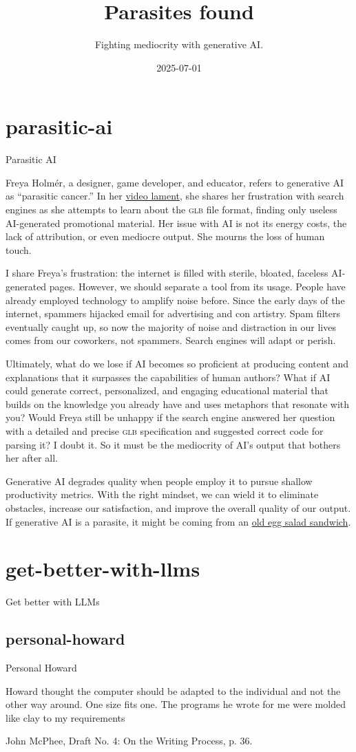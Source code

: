 \documentclass{article}
\title{Parasites found}
\subtitle{Fighting mediocrity with generative AI.}
\date{2025-07-01}
\begin{document}
\section{parasitic-ai}{Parasitic AI}

Freya Holmér, a designer, game developer, and educator, refers to generative AI as ``parasitic cancer.''
In her \href{https://youtu.be/-opBifFfsMY?si=5SZIgOB76GTq0hBu}{video lament},
she shares her frustration with search engines as she attempts to learn about the \textsc{glb} file format,
finding only useless AI-generated promotional material.
Her issue with AI is not its energy costs, the lack of attribution, or even mediocre output.
She mourns the loss of human touch.

I share Freya’s frustration: the internet is filled with sterile, bloated, faceless AI-generated pages.
However, we should separate a tool from its usage.
People have already employed technology to amplify noise before.
Since the early days of the internet, spammers hijacked email for advertising and con artistry.
Spam filters eventually caught up, so now the majority of noise and distraction in our lives comes from our coworkers, not spammers.
Search engines will adapt or perish.

Ultimately, what do we lose if AI becomes so proficient at producing content and explanations that it surpasses the capabilities of human authors?
What if AI could generate correct, personalized, and engaging educational material that builds on the knowledge you already have and uses metaphors that resonate with you?
Would Freya still be unhappy if the search engine answered her question with a detailed and precise \textsc{glb} specification and suggested correct code for parsing it?
I doubt it.
So it must be the mediocrity of AI's output that bothers her after all.

Generative AI degrades quality when people employ it to pursue shallow productivity metrics.
With the right mindset, we can wield it to eliminate obstacles, increase our satisfaction, and improve the overall quality of our output.
If generative AI is a parasite, it might be coming from an \href{https://en.wikipedia.org/wiki/Parasites_Lost}{old egg salad sandwich}.

\section{get-better-with-llms}{Get better with LLMs}
\subsection{personal-howard}{Personal Howard}
\epigraph{
  Howard thought the computer should be adapted to the individual and not the other way around.
  One size fits one.
  The programs he wrote for me were molded like clay to my requirements
}{John McPhee, Draft No. 4: On the Writing Process, p. 36.}
\end{document}
